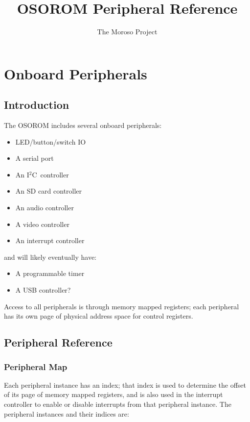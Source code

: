 \documentclass[11pt,openany]{report}
\title{OSOROM Peripheral Reference}
\author{The Moroso Project}
\newcommand\iic{I$^2$C}
\begin{document}
\maketitle
\tableofcontents

\chapter{Onboard Peripherals}

\section{Introduction}
The OSOROM includes several onboard peripherals:
\begin{itemize}
\item LED/button/switch IO
\item A serial port
\item An \iic\ controller
\item An SD card controller
\item An audio controller
\item A video controller
\item An interrupt controller
\end{itemize}
and will likely eventually have:
\begin{itemize}
\item A programmable timer
\item A USB controller?
\end{itemize}

Access to all peripherals is through memory mapped registers; each
peripheral has its own page of physical address space for control
registers.

\section{Peripheral Reference}
\subsection{Peripheral Map}
Each peripheral instance has an index; that index is used to determine
the offset of its page of memory mapped registers, and is also used
in the interrupt controller to enable or disable interrupts from that
peripheral instance. The peripheral instances and their indices are:
\end{document}
